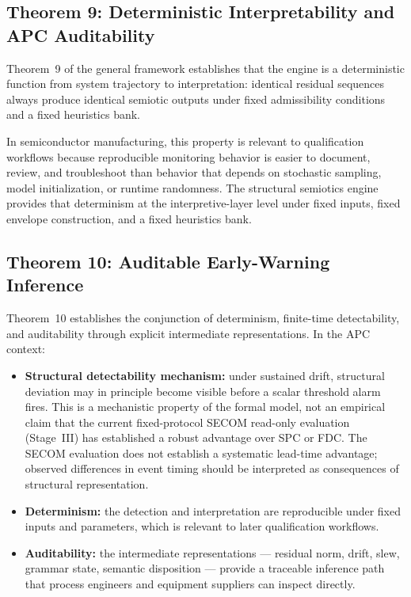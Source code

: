 \documentclass[11pt,letterpaper]{article}
\theoremstyle{scresult}
\begin{document}
\subsection{Theorem 9: Deterministic Interpretability and APC Auditability}

Theorem~9 of the general framework establishes that the engine is a
deterministic function from system trajectory to interpretation: identical
residual sequences always produce identical semiotic outputs under fixed
admissibility conditions and a fixed heuristics bank.

In semiconductor manufacturing, this property is relevant to qualification
workflows because reproducible monitoring behavior is easier to document,
review, and troubleshoot than behavior that depends on stochastic sampling,
model initialization, or runtime randomness. The structural semiotics engine
provides that determinism at the interpretive-layer level under fixed inputs,
fixed envelope construction, and a fixed heuristics bank.

\subsection{Theorem 10: Auditable Early-Warning Inference}

Theorem~10 establishes the conjunction of determinism, finite-time
detectability, and auditability through explicit intermediate representations.
In the APC context:

\begin{itemize}
  \item \textbf{Structural detectability mechanism:} under sustained drift,
        structural deviation may in principle become visible before a scalar
        threshold alarm fires. This is a mechanistic property of the formal
        model, not an empirical claim that the current fixed-protocol SECOM
        read-only evaluation (Stage~III) has established a robust advantage over
        SPC or FDC. The SECOM evaluation does not establish a systematic
        lead-time advantage; observed differences in event timing should be
        interpreted as consequences of structural representation.
  \item \textbf{Determinism:} the detection and interpretation are reproducible
        under fixed inputs and parameters, which is relevant to later
        qualification workflows.
  \item \textbf{Auditability:} the intermediate representations --- residual
        norm, drift, slew, grammar state, semantic disposition --- provide a
        traceable inference path that process engineers and equipment suppliers
        can inspect directly.
\end{itemize}
\end{document}
